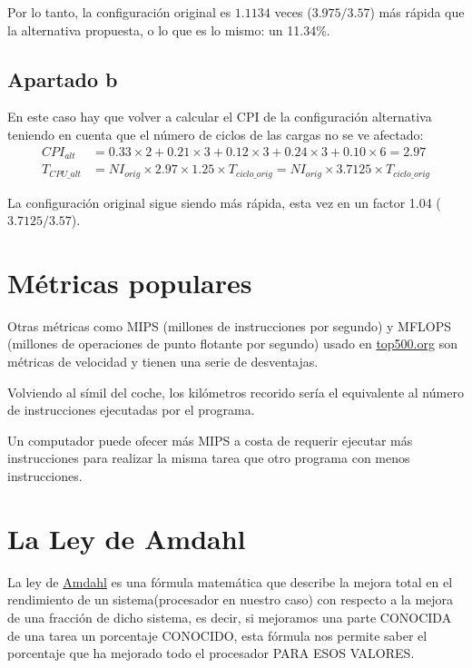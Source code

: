 \documentclass[12pt,onecolumn]{memoir}
\begin{document}
Por lo tanto, la configuración original es $1.1134$ veces ($3.975 / 3.57$) más rápida que la alternativa propuesta, o lo que es lo mismo: un 11.34\%.

\subsection*{Apartado b}

En este caso hay que volver a calcular el CPI de la configuración alternativa teniendo en cuenta que el número de ciclos de las cargas no se ve afectado:
\begin{align*}
CPI_{alt} &= 0.33 \times 2 + 0.21 \times 3 + 0.12 \times 3 + 0.24 \times 3 + 0.10 \times 6 = 2.97 \\
T_{CPU\_alt} &= NI_{orig} \times 2.97 \times 1.25 \times T_{ciclo\_orig} = NI_{orig} \times 3.7125 \times T_{ciclo\_orig}
\end{align*}

La configuración original sigue siendo más rápida, esta vez en un factor 1.04 ($3.7125/3.57$).

\section{Métricas populares}

Otras métricas como MIPS (millones de instrucciones por segundo) y
MFLOPS (millones de operaciones de punto flotante por segundo) usado
en \url{top500.org} son métricas de velocidad y tienen una serie de
desventajas.

Volviendo al símil del coche, los kilómetros recorido sería el
equivalente al número de instrucciones ejecutadas por el programa.

Un computador puede ofecer más MIPS a costa de requerir ejecutar más
instrucciones para realizar la misma tarea que otro programa con menos
instrucciones.

\section{La Ley de Amdahl}

La ley de \href{https://es.wikipedia.org/wiki/Gene_Amdahl}{Amdahl} es una 
fórmula matemática que describe la mejora total en el rendimiento de un 
sistema(procesador en nuestro caso) con respecto a la mejora de una fracción 
de dicho sistema, es decir, si mejoramos una parte CONOCIDA de una tarea un 
porcentaje CONOCIDO, esta fórmula nos permite saber el porcentaje que ha mejorado
todo el procesador PARA ESOS VALORES.
\end{document}
